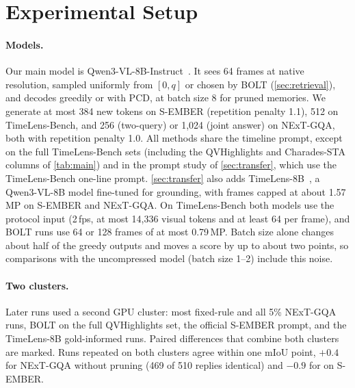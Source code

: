 \section{Experimental Setup}
\label{sec:setup}

\paragraph{Models.}
Our main model is Qwen3-VL-8B-Instruct~\cite{qwen3vl}. It sees 64 frames at native resolution, sampled uniformly
from $[0,q]$ or chosen by BOLT (\cref{sec:retrieval}), and decodes greedily or with PCD, at batch size 8 for pruned
memories. We generate at most 384 new tokens on S-EMBER (repetition penalty 1.1), 512 on TimeLens-Bench, and 256
(two-query) or 1{,}024 (joint answer) on NExT-GQA, both with repetition penalty 1.0. All methods share the timeline
prompt, except on the full TimeLens-Bench sets (including the QVHighlights and Charades-STA columns of
\cref{tab:main}) and in the prompt study of \cref{sec:transfer}, which use the TimeLens-Bench one-line prompt.
\cref{sec:transfer} also adds TimeLens-8B~\cite{timelens}, a Qwen3-VL-8B model fine-tuned for grounding, with
frames capped at about 1.57\,MP on S-EMBER and NExT-GQA. On TimeLens-Bench both models use the protocol input
(2\,fps, at most 14{,}336 visual tokens and at least 64 per frame), and BOLT runs use 64 or 128 frames of at most
0.79\,MP. Batch size alone changes about half of the greedy outputs and moves a score by up to about two points, so
comparisons with the uncompressed model (batch size 1--2) include this noise.

\paragraph{Two clusters.}
Later runs used a second GPU cluster: most fixed-rule and all 5\% NExT-GQA runs, BOLT on the full QVHighlights
set, the official S-EMBER prompt, and the TimeLens-8B gold-informed runs. Paired differences that combine both
clusters are marked. Runs repeated on both clusters agree within one mIoU point, \eg $+0.4$ for NExT-GQA without
pruning (469 of 510 replies identical) and $-0.9$ for \method on S-EMBER.


